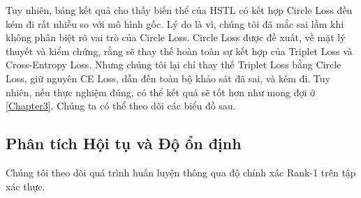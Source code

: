 
Tuy nhiên, bảng kết quả cho thấy biến thể của HSTL có kết hợp Circle Loss đều kém đi rất nhiều so với mô hình gốc. Lý do là vì, chúng tôi đã mắc sai lầm khi không phân biệt rõ vai trò của Circle Loss. Circle Loss được đề xuất, về mặt lý thuyết và kiểm chứng, rằng sẽ thay thế hoàn toàn sự kết hợp của Triplet Loss và Cross-Entropy Loss. Nhưng chúng tôi lại chỉ thay thế Triplet Loss bằng Circle Loss, giữ nguyên CE Loss, dẫn đến toàn bộ khảo sát đã sai, và kém đi.  Tuy nhiên, nếu thực nghiệm đúng, có thể kết quả sẽ tốt hơn như mong đợi ở \ref{Chapter3}. Chúng ta có thể theo dõi các biểu đồ sau.


\subsection{Phân tích Hội tụ và Độ ổn định}
Chúng tôi theo dõi quá trình huấn luyện thông qua độ chính xác Rank-1 trên tập xác thực.

